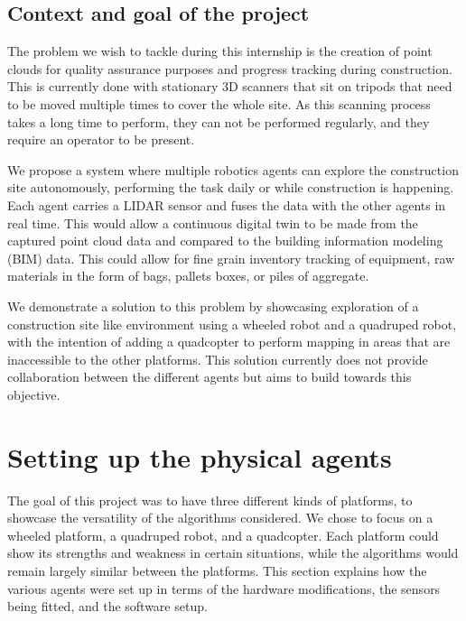 \documentclass[12pt]{article}
\begin{document}
    \subsection{Context and goal of the project}   
    
    The problem we wish to tackle during this internship is the creation of point clouds for quality assurance purposes and progress tracking during construction. This is currently done with stationary 3D scanners that sit on tripods that need to be moved multiple times to cover the whole site. As this scanning process takes a long time to perform, they can not be performed regularly, and they require an operator to be present.
   
    We propose a system where multiple robotics agents can explore the construction site autonomously, performing the task daily or while construction is happening. Each agent carries a LIDAR sensor and fuses the data with the other agents in real time. This would allow a continuous digital twin to be made from the captured point cloud data and compared to the building information modeling (BIM) data. This could allow for fine grain inventory tracking of equipment, raw materials in the form of bags, pallets boxes, or piles of aggregate.
   
    We demonstrate a solution to this problem by showcasing exploration of a construction site like environment using a wheeled robot and a quadruped robot, with the intention of adding a quadcopter to perform mapping in areas that are inaccessible to the other platforms. This solution currently does not provide collaboration between the different agents but aims to build towards this objective. 

\newpage

\section[Setting up the physical agents]{Setting up the physical agents}
\label{section:big title}%

        The goal of this project was to have three different kinds of platforms, to showcase the versatility of the algorithms considered. We chose to focus on a wheeled platform, a quadruped robot, and a quadcopter. Each platform could show its strengths and weakness in certain situations, while the algorithms would remain largely similar between the platforms. This section explains how the various agents were set up in terms of the hardware modifications, the sensors being fitted, and the software setup.
\end{document}
